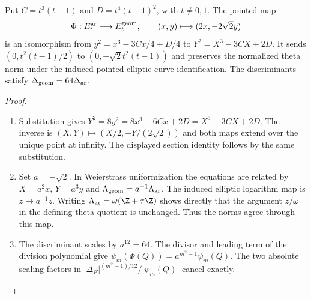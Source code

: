 \begin{lemma}
\label{I:weierstrass-comparison}
Put $C=t^3(t-1)$ and $D=t^4(t-1)^2$, with $t\ne0,1$.
The pointed map
\[
 \Phi:E_t^{\rm ar}\longrightarrow E_t^{\rm geom},\qquad
 (x,y)\longmapsto(2x,-2\sqrt2y)
\]
is an isomorphism from
$y^2=x^3-3Cx/4+D/4$ to $Y^2=X^3-3CX+2D$.
It sends $(0,t^2(t-1)/2)$ to
$(0,-\sqrt2t^2(t-1))$ and preserves the normalized theta norm
under the induced pointed elliptic-curve identification.
The discriminants satisfy $\Delta_{\rm geom}=64\Delta_{\rm ar}$.
\end{lemma}
\begin{proof}
\begin{enumerate}[label=\arabic*.]
\item Substitution gives
$Y^2=8y^2=8x^3-6Cx+2D=X^3-3CX+2D$.
The inverse is $(X,Y)\mapsto(X/2,-Y/(2\sqrt2))$ and both maps
extend over the unique point at infinity. The displayed section
identity follows by the same substitution.
\item Set $a=-\sqrt2$. In Weierstrass uniformization the equations
are related by $X=a^2x$, $Y=a^3y$ and
$\Lambda_{\rm geom}=a^{-1}\Lambda_{\rm ar}$.
The induced elliptic logarithm map is $z\mapsto a^{-1}z$.
Writing $\Lambda_{\rm ar}=\omega(\Z+\tau\Z)$ shows directly
that the argument $z/\omega$ in the defining theta quotient is
unchanged. Thus the norms agree through this map.
\item The discriminant scales by $a^{12}=64$.
The divisor and leading term of the division polynomial give
$\psi_m(\Phi(Q))=a^{m^2-1}\psi_m(Q)$.
The two absolute scaling factors in
$|\Delta_E|^{(m^2-1)/12}/|\psi_m(Q)|$ cancel exactly.
\end{enumerate}
\end{proof}
